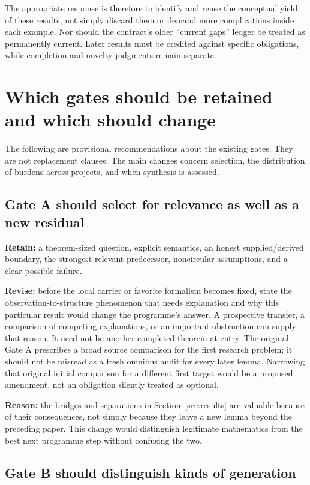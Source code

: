 \documentclass[11pt]{article}
\begin{document}
The appropriate response is therefore to identify and reuse the conceptual yield of these results, not simply discard them or demand more complications inside each example. Nor should the contract's older ``current gaps'' ledger be treated as permanently current. Later results must be credited against specific obligations, while completion and novelty judgments remain separate.

\section{Which gates should be retained and which should change}
\label{sec:gates}

The following are provisional recommendations about the existing gates. They are not replacement clauses. The main changes concern selection, the distribution of burdens across projects, and when synthesis is assessed.

\subsection{Gate A should select for relevance as well as a new residual}

\textbf{Retain:} a theorem-sized question, explicit semantics, an honest supplied/derived boundary, the strongest relevant predecessor, noncircular assumptions, and a clear possible failure.

\textbf{Revise:} before the local carrier or favorite formalism becomes fixed, state the observation-to-structure phenomenon that needs explanation and why this particular result would change the programme's answer. A prospective transfer, a comparison of competing explanations, or an important obstruction can supply that reason. It need not be another completed theorem at entry. The original Gate A prescribes a broad source comparison for the first research problem; it should not be misread as a fresh omnibus audit for every later lemma. Narrowing that original initial comparison for a different first target would be a proposed amendment, not an obligation silently treated as optional.

\textbf{Reason:} the bridges and separations in Section~\ref{sec:results} are valuable because of their consequences, not simply because they leave a new lemma beyond the preceding paper. This change would distinguish legitimate mathematics from the best next programme step without confusing the two.

\subsection{Gate B should distinguish kinds of generation}
\end{document}
